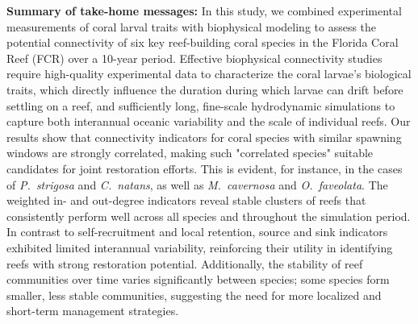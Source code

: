 \documentclass[preprint,12pt,authoryear]{elsarticle}
\begin{document}
	\textbf{Summary of take-home messages:} In this study, we combined experimental measurements of coral larval traits with biophysical modeling to assess the potential connectivity of six key reef-building coral species in the Florida Coral Reef (FCR) over a 10-year period. Effective biophysical connectivity studies require high-quality experimental data to characterize the coral larvae's biological traits, which directly influence the duration during which larvae can drift before settling on a reef, and sufficiently long, fine-scale hydrodynamic simulations to capture both interannual oceanic variability and the scale of individual reefs. Our results show that connectivity indicators for coral species with similar spawning windows are strongly correlated, making such "correlated species" suitable candidates for joint restoration efforts. This is evident, for instance, in the cases of \textit{P.~strigosa} and \textit{C.~natans}, as well as \textit{M.~cavernosa} and \textit{O.~faveolata}. The weighted in- and out-degree indicators reveal stable clusters of reefs that consistently perform well across all species and throughout the simulation period. In contrast to self-recruitment and local retention, source and sink indicators exhibited limited interannual variability, reinforcing their utility in identifying reefs with strong restoration potential. Additionally, the stability of reef communities over time varies significantly between species; some species form smaller, less stable communities, suggesting the need for more localized and short-term management strategies.
	
\end{document}
